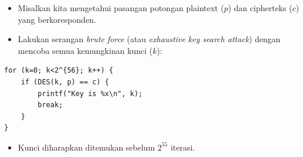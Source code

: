 \documentclass{article}
\begin{document}

\begin{itemize}
    \item Misalkan kita mengetahui pasangan potongan plaintext ($p$) dan cipherteks ($c$) yang berkoresponden.
    \item Lakukan serangan \textit{brute force} (atau \textit{exhaustive key search attack}) dengan mencoba semua kemungkinan kunci ($k$):
\end{itemize}

\vspace{5mm}

\begin{verbatim}
for (k=0; k<2^{56}; k++) {
    if (DES(k, p) == c) {
        printf("Key is %x\n", k);
        break;
    }
}
\end{verbatim}

\vspace{5mm}

\begin{itemize}
    \item Kunci diharapkan ditemukan sebelum $2^{55}$ iterasi.
\end{itemize}
\end{document}
